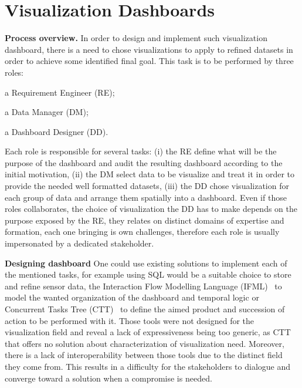 \documentclass{acm_proc_article-sp}
\begin{document}
\section{Visualization Dashboards}
\textbf{Process overview.}
In order to design and implement such visualization dashboard, there
is a need to chose visualizations to apply to refined datasets in
order to achieve some identified final goal. This task is to be
performed by three roles:
\begin{myenumerate}
\item a Requirement Engineer (RE);
\item a Data Manager (DM);
\item a Dashboard Designer (DD).
\end{myenumerate}
Each role is responsible for several tasks: (i) the RE define what
will be the purpose of the dashboard and audit the resulting dashboard
according to the initial motivation, (ii) the DM select data to be
visualize and treat it in order to provide the needed well formatted
datasets, (iii) the DD chose visualization for each group of data and
arrange them spatially into a dashboard.
Even if those roles collaborates, \eg the choice of visualization the
DD has to make depends on the purpose exposed by the RE, they relates
on distinct domains of expertise and formation, each one bringing is
own challenges, therefore each role is usually impersonated by a
dedicated stakeholder.  

\textbf{Designing dashboard}
One could use existing solutions to implement each of the mentioned
tasks, for example using SQL would be a suitable choice to store and
refine sensor data, the Interaction Flow Modelling Language
(IFML)~\cite{ifml} to model the wanted organization of the dashboard and
temporal logic or Concurrent Tasks Tree (CTT)~\cite{ctt} to define the
aimed product and succession of action to be performed with it.
Those tools were not designed for the visualization field and reveal a
lack of expressiveness being too generic, as CTT that offers no solution
about characterization of visualization need.
Moreover, there is a lack of interoperability between those tools due
to the distinct field they come from. This results in a difficulty for
the stakeholders to dialogue and converge toward a solution when a
compromise is needed.
\end{document}
